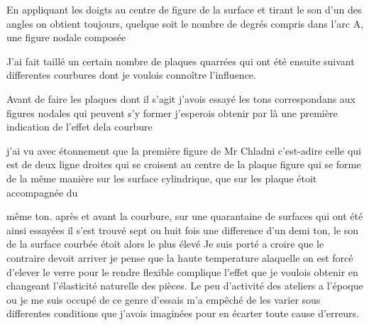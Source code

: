\documentclass[11pt,a4paper]{article}
\begin{document}
En  appliquant les doigts au centre
de figure de la surface et tirant le son d'un des angles
on obtient  toujours, quelque soit le nombre de
degrés compris dans l'arc A, une figure nodale composée

J'ai fait taillé un certain nombre de plaques quarrées
qui ont été ensuite  suivant  differentes courbures
dont je voulois  connoître l'influence.

Avant de faire  les plaques dont il s'agit
j'avois essayé  les tons correspondans aux 
figures 
nodales qui peuvent s'y former j'esperois obtenir par là
une première indication de l'effet dela courbure

j'ai vu avec étonnement que la première figure  de
Mr Chladni c'est-adire celle qui est   de
deux ligne droites qui se croisent au centre de
la plaque figure qui se forme  de la même
manière sur les surface cylindrique, que sur les 
plaque étoit  accompagnée du


même ton. après et avant la courbure, sur une quarantaine
de surfaces qui ont été ainsi essayées il s'est trouvé
sept ou huit fois une difference d'un demi ton, le
son de la surface courbée étoit alors le plus élevé
Je suis porté a croire que le contraire devoit arriver
je pense que la haute temperature alaquelle on est
forcé d'elever le verre pour le rendre flexible complique
l'effet que je voulois obtenir en changeant l'élasticité
naturelle des pièces. Le peu d'activité des ateliers
a l'époque ou je me suis occupé de ce genre
 d'essais m'a empêché de les varier sous  differentes
conditions que j'avois imaginées pour en écarter toute
cause d'erreurs.
\end{document}

